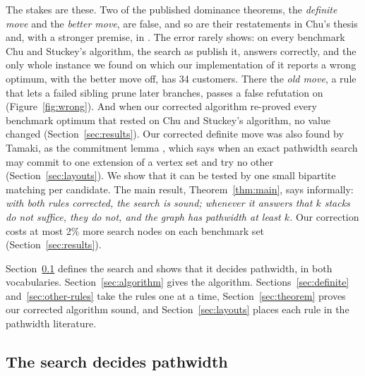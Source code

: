 The stakes are these. Two of the published dominance theorems, the
\emph{definite move} and the \emph{better move}, are false, and so are their
restatements in Chu's thesis \citep{Chu2011} and, with a stronger premise, in
\citet{Fink2012}. The error rarely shows: on every benchmark Chu and Stuckey's algorithm, the search
as \citet{ChuStuckey2009} publish it, answers correctly, and the only whole
instance we found on which our implementation of it reports a wrong optimum,
with the better move off, has 34 customers. There the \emph{old move}, a rule
that lets a failed sibling prune later branches, passes a false refutation on
(Figure~\ref{fig:wrong}). And when our corrected algorithm re-proved every
benchmark optimum that rested on Chu and Stuckey's algorithm, no value changed (Section~\ref{sec:results}). Our corrected definite
move was also found by Tamaki, as the commitment lemma \citep[Lemma~1]{Kitsunai2016},
which says when an exact pathwidth search may commit to one extension of a
vertex set and try no other (Section~\ref{sec:layouts}). We
show that it can be tested by one small bipartite matching per candidate. The
main result, Theorem~\ref{thm:main}, says informally: \emph{with both rules
corrected, the search is sound; whenever it answers that $k$ stacks do not
suffice, they do not, and the graph has pathwidth at least $k$.} Our correction
costs at most 2\% more search nodes on each benchmark set
(Section~\ref{sec:results}).

Section~\ref{sec:search-def} defines the search and shows that it decides
pathwidth, in both vocabularies. Section~\ref{sec:algorithm} gives the
algorithm. Sections~\ref{sec:definite} and~\ref{sec:other-rules} take the
rules one at a time, Section~\ref{sec:theorem} proves our corrected algorithm
sound, and Section~\ref{sec:layouts} places each rule in the pathwidth
literature.

\subsection{The search decides pathwidth}
\label{sec:search-def}

